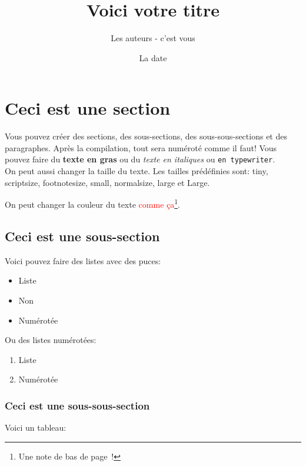 \documentclass[paper=a4, fontsize=11pt]{article}
\begin{document}
\title{Voici votre titre}
\author{Les auteurs - c'est vous}
\date{La date}
\maketitle

\section{Ceci est une section}
Vous pouvez créer des sections, des sous-sections, des sous-sous-sections et des paragraphes. Après
la compilation, tout sera numéroté comme il faut! Vous pouvez faire du \textbf{texte en gras} ou du
\textit{texte en italiques} ou \texttt{en typewriter}. \\

On peut aussi {\small changer} {\large la taille} {\tiny du texte}.  Les tailles prédéfinies sont:
{\tiny tiny}, {\scriptsize scriptsize}, {\footnotesize footnotesize}, {\small small}, {\normalsize
  normalsize}, {\large large} et {\Large Large}.

On peut changer la couleur du texte \textcolor{red}{comme
  ça}\footnote{Une note de bas de page~!}.

\subsection{Ceci est une sous-section}
Voici pouvez faire des listes avec des puces:

\begin{itemize}
\item Liste
\item Non
\item Numérotée
\end{itemize}

\vspace{0.5cm} %

Ou des listes numérotées:
\begin{enumerate}
\item Liste
\item Numérotée
\end{enumerate}

\subsubsection{Ceci est une sous-sous-section}

Voici un tableau:\\ %
\end{document}
